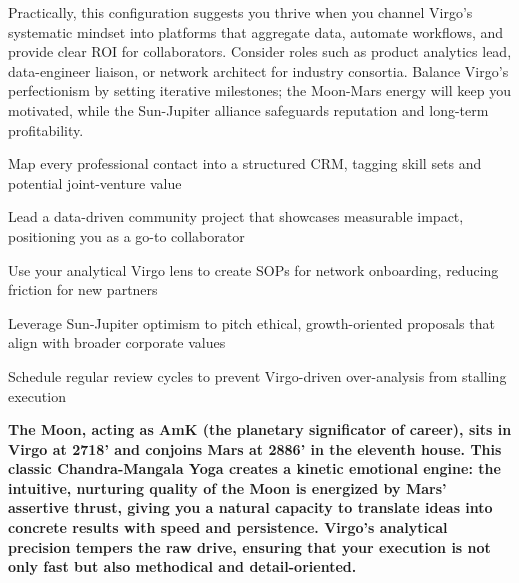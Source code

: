 {\fontsize{9}{13}\selectfont Practically, this configuration suggests you thrive when you channel Virgo's systematic mindset into platforms that aggregate data, automate workflows, and provide clear ROI for collaborators. Consider roles such as product analytics lead, data-engineer liaison, or network architect for industry consortia. Balance Virgo's perfectionism by setting iterative milestones; the Moon-Mars energy will keep you motivated, while the Sun-Jupiter alliance safeguards reputation and long-term profitability.}\par\vspace{1.8mm}

\begin{diamondlist}
  \item {\fontsize{8.5}{12}\selectfont Map every professional contact into a structured CRM, tagging skill sets and potential joint-venture value}
  \item {\fontsize{8.5}{12}\selectfont Lead a data-driven community project that showcases measurable impact, positioning you as a go-to collaborator}
  \item {\fontsize{8.5}{12}\selectfont Use your analytical Virgo lens to create SOPs for network onboarding, reducing friction for new partners}
  \item {\fontsize{8.5}{12}\selectfont Leverage Sun-Jupiter optimism to pitch ethical, growth-oriented proposals that align with broader corporate values}
  \item {\fontsize{8.5}{12}\selectfont Schedule regular review cycles to prevent Virgo-driven over-analysis from stalling execution}
\end{diamondlist}


\label{topic21}

{\fontsize{9.5}{13.8}\selectfont\bfseries\color{DeepSlate} The Moon, acting as AmK (the planetary significator of career), sits in Virgo at 27\textdegree{}18' and conjoins Mars at 28\textdegree{}86' in the eleventh house. This classic Chandra-Mangala Yoga creates a kinetic emotional engine: the intuitive, nurturing quality of the Moon is energized by Mars' assertive thrust, giving you a natural capacity to translate ideas into concrete results with speed and persistence. Virgo's analytical precision tempers the raw drive, ensuring that your execution is not only fast but also methodical and detail-oriented.}\par\vspace{2mm}

